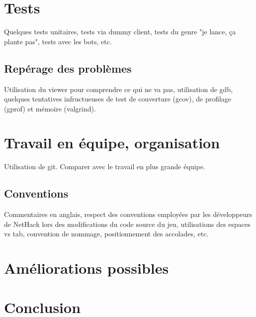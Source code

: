 \documentclass[a4paper,12pt]{article}
\begin{document}
\section{Tests}
Quelques tests unitaires, tests via dummy client, tests du genre "je lance, ça
plante pas", tests avec les bots, etc.

\subsection*{Repérage des problèmes}
Utilisation du viewer pour comprendre ce qui ne va pas, utilisation de gdb,
quelques tentatives infructueuses de test de couverture (gcov), de profilage
(gprof) et mémoire (valgrind).

\section{Travail en équipe, organisation}

Utilisation de git.
Comparer avec le travail en plus grande équipe.

\subsection{Conventions}
Commentaires en anglais, respect des conventions employées par les
développeurs de NetHack lors des modifications du code source du jeu,
utilisations des espaces vs tab, convention de nommage, positionnement des
accolades, etc.

\section{Améliorations possibles}

\section{Conclusion}
\end{document}
